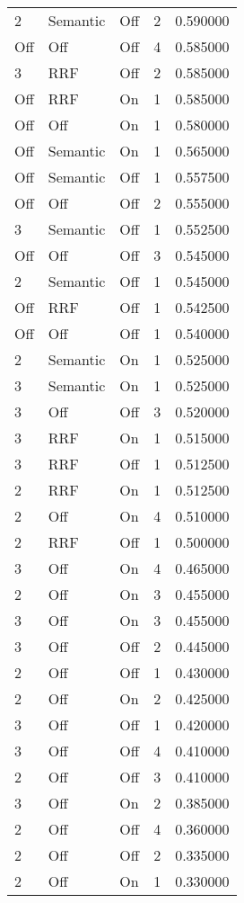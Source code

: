 \begin{tabular}{llllr}
2 & Semantic & Off & 2 & 0.590000 \\
Off & Off & Off & 4 & 0.585000 \\
3 & RRF & Off & 2 & 0.585000 \\
Off & RRF & On & 1 & 0.585000 \\
Off & Off & On & 1 & 0.580000 \\
Off & Semantic & On & 1 & 0.565000 \\
Off & Semantic & Off & 1 & 0.557500 \\
Off & Off & Off & 2 & 0.555000 \\
3 & Semantic & Off & 1 & 0.552500 \\
Off & Off & Off & 3 & 0.545000 \\
2 & Semantic & Off & 1 & 0.545000 \\
Off & RRF & Off & 1 & 0.542500 \\
Off & Off & Off & 1 & 0.540000 \\
2 & Semantic & On & 1 & 0.525000 \\
3 & Semantic & On & 1 & 0.525000 \\
3 & Off & Off & 3 & 0.520000 \\
3 & RRF & On & 1 & 0.515000 \\
3 & RRF & Off & 1 & 0.512500 \\
2 & RRF & On & 1 & 0.512500 \\
2 & Off & On & 4 & 0.510000 \\
2 & RRF & Off & 1 & 0.500000 \\
3 & Off & On & 4 & 0.465000 \\
2 & Off & On & 3 & 0.455000 \\
3 & Off & On & 3 & 0.455000 \\
3 & Off & Off & 2 & 0.445000 \\
2 & Off & Off & 1 & 0.430000 \\
2 & Off & On & 2 & 0.425000 \\
3 & Off & Off & 1 & 0.420000 \\
3 & Off & Off & 4 & 0.410000 \\
2 & Off & Off & 3 & 0.410000 \\
3 & Off & On & 2 & 0.385000 \\
2 & Off & Off & 4 & 0.360000 \\
2 & Off & Off & 2 & 0.335000 \\
2 & Off & On & 1 & 0.330000 \\
\bottomrule
\end{tabular}
